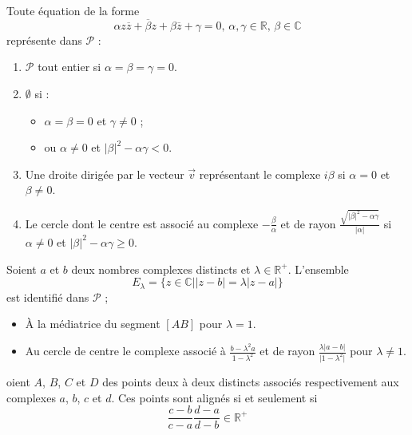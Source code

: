 	\begin{theorem}
		Toute équation de la forme
		\[ \alpha z \overline{z} + \overline{\beta} z + \beta \overline{z} + \gamma = 0, \, \alpha, \gamma \in \mathbb{R}, \, \beta \in \mathbb{C} \]
		représente dans $\mathcal{P}$ :
		\begin{enumerate}[label=(\roman*)]
			\item $\mathcal{P}$ tout entier si $\alpha = \beta = \gamma = 0$.
			\item $\emptyset$ si :
			\begin{itemize}
				\item $\alpha = \beta = 0$ et $\gamma \neq 0$ ;
				\item ou $\alpha \neq 0$ et $\vert \beta \vert^2 - \alpha \gamma < 0$.
			\end{itemize}
			\item Une droite dirigée par le vecteur $\overrightarrow{v}$ représentant le complexe $i\beta$ si $\alpha = 0$ et $\beta \neq 0$.
			\item Le cercle dont le centre est associé au complexe $-\frac{\beta}{\alpha}$ et de rayon $\frac{\sqrt{\vert \beta \vert^2 - \alpha \gamma}}{\vert \alpha \vert}$ si $\alpha \neq 0$ et $\vert \beta \vert^2 - \alpha \gamma \geq 0$.
		\end{enumerate}
	\end{theorem}
	
	\begin{corollary}
		Soient $a$ et $b$ deux nombres complexes distincts et $\lambda \in \mathbb{R}^+$. L'ensemble
		\[ E_\lambda = \{ z \in \mathbb{C} \mid \vert z - b \vert = \lambda \vert z - a \vert \} \]
		est identifié dans $\mathcal{P}$ ;
		\begin{itemize}
			\item À la médiatrice du segment $[AB]$ pour $\lambda = 1$.
			\item Au cercle de centre le complexe associé à $\frac{b-\lambda^2 a}{1 - \lambda^2}$ et de rayon $\frac{\lambda \vert a - b \vert}{\vert 1 - \lambda^2 \vert}$ pour $\lambda \neq 1$.
		\end{itemize}
	\end{corollary}
	
	\begin{theorem}
		oient $A$, $B$, $C$ et $D$ des points deux à deux distincts associés respectivement aux complexes $a$, $b$, $c$ et $d$. Ces points sont alignés si et seulement si
		\[ \frac{c-b}{c-a} \frac{d-a}{d-b} \in \mathbb{R}^+ \]
	\end{theorem}
	
